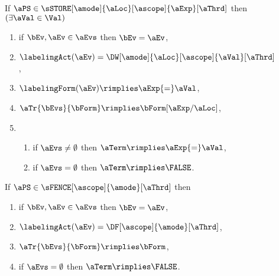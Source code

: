 \begin{figure}
  \noindent
  If $\aPS \in \sSTORE[\amode]{\aLoc}[\ascope]{\aExp}[\aThrd]$ then
  $(\exists\aVal\in\Val)$
  \begin{multicols}{2}
    \begin{enumerate}[topsep=0pt,label=(\textsc{w}\arabic*),ref=\textsc{w}\arabic*]
    \item \label{write-E}
      if $\bEv,\aEv\in\aEvs$ then $\bEv=\aEv$,
    \item \label{write-lambda}
      $\labelingAct(\aEv) = \DW[\amode]{\aLoc}[\ascope]{\aVal}[\aThrd]$,
    \item \label{write-kappa}
      \begin{math}
        \labelingForm(\aEv) \rimplies
        \aExp{=}\aVal
      \end{math},    
    \item \label{write-tau}
      \begin{math}
        \aTr{\bEvs}{\bForm} \rimplies 
        \bForm
        [\aExp/\aLoc]
      \end{math},
    \item[] 
      \begin{enumerate}[leftmargin=0pt]
      \item \label{write-term-nonempty}
        if $\aEvs\neq\emptyset$ then $\aTerm \rimplies \aExp{=}\aVal$,
      \item \label{write-term-empty}
        if $\aEvs=\emptyset$ then $\aTerm \rimplies \FALSE$.
      \end{enumerate}
    \end{enumerate}
  \end{multicols}
  \medskip

  \noindent
  If $\aPS \in \sFENCE[\ascope]{\amode}[\aThrd]$ then
  \begin{multicols}{2}
    \begin{enumerate}[topsep=0pt,label=(\textsc{f}\arabic*),ref=\textsc{f}\arabic*]
    \item \label{fork-E}
      if $\bEv,\aEv\in\aEvs$ then $\bEv=\aEv$,
    \item \label{fork-lambda}
      $\labelingAct(\aEv) = \DF[\ascope]{\amode}[\aThrd]$,
    \item \label{fork-tau}
      $\aTr{\bEvs}{\bForm} \rimplies \bForm$,
    \item \label{fork-term}
      if $\aEvs=\emptyset$ then $\aTerm \rimplies \FALSE$.
    \end{enumerate}
  \end{multicols}


\end{figure}
